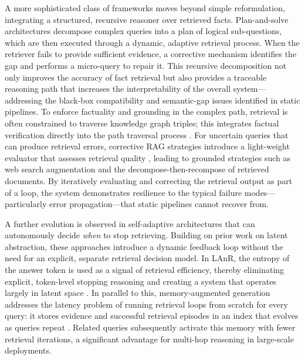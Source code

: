 \documentclass[11pt,a4paper]{article}
\begin{document}
A more sophisticated class of frameworks moves beyond simple reformulation, integrating a structured, recursive reasoner over retrieved facts. Plan-and-solve architectures decompose complex queries into a plan of logical sub-questions, which are then executed through a dynamic, adaptive retrieval process. When the retriever fails to provide sufficient evidence, a corrective mechanism identifies the gap and performs a micro-query to repair it. This recursive decomposition not only improves the accuracy of fact retrieval but also provides a traceable reasoning path that increases the interpretability of the overall system---addressing the black-box compatibility and semantic-gap issues identified in static pipelines. To enforce factuality and grounding in the complex path, retrieval is often constrained to traverse knowledge graph triples; this integrates factual verification directly into the path traversal process \cite{arxiv:2503.10677v3}. For uncertain queries that can produce retrieval errors, corrective RAG strategies introduce a light-weight evaluator that assesses retrieval quality \cite{arxiv:2401.15884v2}, leading to grounded strategies such as web search augmentation and the decompose-then-recompose of retrieved documents. By iteratively evaluating and correcting the retrieval output as part of a loop, the system demonstrates resilience to the typical failure modes---particularly error propagation---that static pipelines cannot recover from.

A further evolution is observed in self-adaptive architectures that can autonomously decide \emph{when} to stop retrieving. Building on prior work on latent abstraction, these approaches introduce a dynamic feedback loop without the need for an explicit, separate retrieval decision model. In LAnR, the entropy of the answer token is used as a signal of retrieval efficiency, thereby eliminating explicit, token-level stopping reasoning and creating a system that operates largely in latent space \cite{arxiv:2604.17866v2}. In parallel to this, memory-augmented generation addresses the latency problem of running retrieval loops from scratch for every query: it stores evidence and successful retrieval episodes in an index that evolves as queries repeat \cite{arxiv:2603.01783v1}. Related queries subsequently activate this memory with fewer retrieval iterations, a significant advantage for multi-hop reasoning in large-scale deployments.
\end{document}
